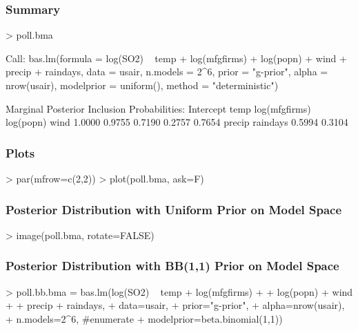 \documentclass[]{beamer}
\begin{document}
\begin{frame}[fragile]\frametitle{Summary}

\begin{small}
\begin{Schunk}
\begin{Sinput}
> poll.bma
\end{Sinput}
\begin{Soutput}
Call:
bas.lm(formula = log(SO2) ~ temp + log(mfgfirms) + log(popn) + 
    wind + precip + raindays, data = usair, n.models = 2^6, prior = "g-prior", 
    alpha = nrow(usair), modelprior = uniform(), method = "deterministic")


 Marginal Posterior Inclusion Probabilities: 
    Intercept           temp  log(mfgfirms)      log(popn)           wind  
       1.0000         0.9755         0.7190         0.2757         0.7654  
       precip       raindays  
       0.5994         0.3104  
\end{Soutput}
\end{Schunk}
\end{small}

\end{frame}
\begin{frame}[fragile]\frametitle{Plots}

\centering
\begin{Schunk}
\begin{Sinput}
> par(mfrow=c(2,2))
> plot(poll.bma, ask=F)
\end{Sinput}
\end{Schunk}
\end{frame}

\begin{frame}\frametitle{Posterior Distribution  with Uniform Prior on Model Space}


\begin{Schunk}
\begin{Sinput}
> image(poll.bma, rotate=FALSE)
\end{Sinput}
\end{Schunk}


\end{frame}

\begin{frame}[fragile]\frametitle{Posterior Distribution  with BB(1,1) Prior on Model Space}


\begin{Schunk}
\begin{Sinput}
> poll.bb.bma = bas.lm(log(SO2) ~ temp + log(mfgfirms) +
+                                 log(popn) + wind +
+                                 precip + raindays,
+                      data=usair,
+                      prior="g-prior",
+                      alpha=nrow(usair),
+                      n.models=2^6,  #enumerate
+                      modelprior=beta.binomial(1,1))
\end{Sinput}
\end{Schunk}

\end{frame}
\end{document}
